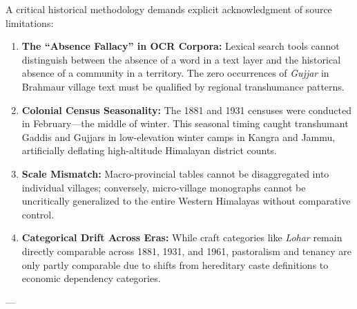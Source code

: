 \documentclass[11pt,a4paper]{article}
\begin{document}
A critical historical methodology demands explicit acknowledgment of source limitations:
\begin{enumerate}[leftmargin=*]
    \item \textbf{The ``Absence Fallacy'' in OCR Corpora:} Lexical search tools cannot distinguish between the absence of a word in a text layer and the historical absence of a community in a territory. The zero occurrences of \textit{Gujjar} in Brahmaur village text must be qualified by regional transhumance patterns.
    \item \textbf{Colonial Census Seasonality:} The 1881 and 1931 censuses were conducted in February---the middle of winter. This seasonal timing caught transhumant Gaddis and Gujjars in low-elevation winter camps in Kangra and Jammu, artificially deflating high-altitude Himalayan district counts.
    \item \textbf{Scale Mismatch:} Macro-provincial tables cannot be disaggregated into individual villages; conversely, micro-village monographs cannot be uncritically generalized to the entire Western Himalayas without comparative control.
    \item \textbf{Categorical Drift Across Eras:} While craft categories like \textit{Lohar} remain directly comparable across 1881, 1931, and 1961, pastoralism and tenancy are only partly comparable due to shifts from hereditary caste definitions to economic dependency categories.
\end{enumerate}

---
\end{document}
